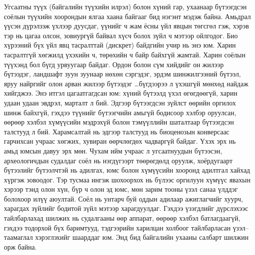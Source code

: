 Угсаатны түүх (байгалийн түүхийн илрэл) болон хүний гар, ухаанаар бүтээгдсэн соёлын түүхийн хоорондын ялгаа хаана байгааг бид нэгэнт мэдэж байна. Амьдрал үүсэн дүрэлзэж үхлээр дуусдаг, үүнийг ч жам ёсны үйл явцын төгсгөл гэж, хэрэв тэр нь цагаа олсон, зовиургүй байвал хүсч болох зүйл ч мэтээр ойлгодог. Био хүрээний бүх үйл явц тасралттай (дискрет) байдгийн учир нь энэ юм. Харин тасралтгүй хөгжилд үхэхийн ч, төрөхийн ч байр байхгүй жамтай.
Харин соёлын түүхэнд бол бүгд урвуугаар байдаг. Ордон болон сүм хийдийг он жилээр бүтээдэг, ландшафт зуун зуунаар нөхөн сэргэдэг, эрдэм шинжилгээний бүтээл, яруу найргийг олон арван жилээр бүтээдэг …бүгдээрээ л үхэшгүй мөнхөд найдаж хийгджээ. Энэ итгэл цагаатгагдсан юм: хүний бүтээлд үхэл өгөгдөөгүй, харин удаан удаан эвдрэл, марталт л бий. Эдгээр бүтээгдсэн зүйлст өөрийн оргилох шинж байхгүй, гэхдээ түүнийг бүтээгчийн амьгүй бодисоор хэлбэр оруулсан, өөрөөр хэлбэл хүмүүсийн мэдрэхүй болон тэмүүллийн шаталтаар бүтээгдсэн талстууд л бий. Харамсалтай нь эдгээр талстууд нь биоценозын конверсаас гарчихсан учраас хөгжих, хувиран өөрчлөгдөх чадваргүй байдаг. Үхэх эрх нь амьд юмсын давуу эрх мөн.
Чухам ийм учраас л угсаатнуудын бүтээсэн, археологичдын судалдаг соёл нь нэгдүгээрт төөрөгдөлд оруулж, хоёрдугаарт бүтээлийг бүтээлчтэй нь адилгах, юмс болон хүмүүсийн хооронд адилтгал хайхад хүргэж зовоодог. Тэр тусмаа ингэж шохоорхох нь бүлээс оргилуун хүмүүс явахын хэрээр тэнд олон хүн, бүр ч олон эд юмс, мөн зарим тооны үзэл санаа үлддэг болохоор илүү аюултай. Соёл нь унтарч буй оддын адилаар ажиглагчийг хуурч, харагдах зүйлийг бодитой зүйл мэтээр харагдуулдаг. Гэхдээ үзэгдлийг дүрслэхээс тайлбарлахад шилжих нь судалгааны өөр аппарат, өөрөөр хэлбэл батлагдаагүй, гэхдээ тодорхой бүх баримтууд, тэдгээрийн харилцан холбоог тайлбарласан үзэл–таамаглал хэрэглэхийг шаарддаг юм. Энд бид байгалийн ухааны салбарт шилжин орж байна.
